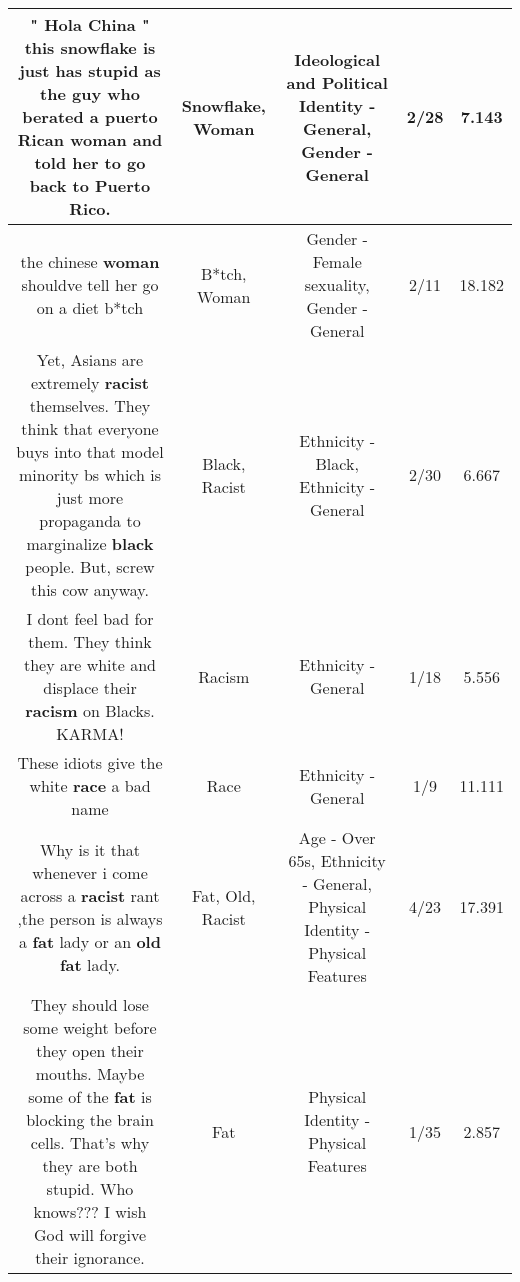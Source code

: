 \documentclass[11pt]{article}
\newlength\mylength
\begin{document}
\begin{center}
\begin{longtable}{|C{.65\mylength}|C{.30\mylength}|C{.12\mylength}|C{.12\mylength}|C{.12\mylength}|}
  \small " Hola China " this \textbf{snowflake} is just has stupid as the guy who berated a puerto Rican \textbf{woman} and told her  to go back to Puerto Rico.\normalsize   & Snowflake, Woman &  Ideological and Political Identity - General, Gender - General & 2/28 & 7.143 \\  \hline
  \small the chinese \textbf{woman} shouldve tell her go on a diet b*tch\normalsize   & B*tch, Woman & Gender - Female sexuality, Gender - General & 2/11 & 18.182 \\  \hline
  \small Yet, Asians are extremely \textbf{racist} themselves. They think that  everyone buys into that model minority bs which is just more propaganda to marginalize \textbf{black} people. But, screw this cow anyway.\normalsize   & Black, Racist & Ethnicity - Black, Ethnicity - General & 2/30 & 6.667 \\  \hline
  \small I dont feel bad for them. They think they are white and displace their \textbf{racism} on Blacks. KARMA!\normalsize   & Racism & Ethnicity - General & 1/18 & 5.556 \\  \hline
  \small These idiots give the white \textbf{race} a bad name\normalsize   & Race & Ethnicity - General & 1/9 & 11.111 \\  \hline
  \small Why is it that whenever i come across a \textbf{racist} rant ,the person is always a \textbf{fat} lady or an \textbf{old} \textbf{fat} lady.\normalsize   & Fat, Old, Racist & Age - Over 65s, Ethnicity - General, Physical Identity - Physical Features & 4/23 & 17.391 \\  \hline
  \small They should lose some weight before they open their mouths. Maybe some of the \textbf{fat} is blocking the brain cells. That's why they are both stupid. Who knows??? I wish God will forgive their ignorance.\normalsize   & Fat & Physical Identity - Physical Features & 1/35 & 2.857 \\  \hline

\end{longtable}
\end{center}
\end{document}
